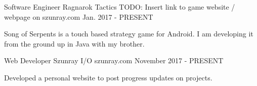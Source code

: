 


\begin{cventries}


\cventry
{Software Engineer} %
{Ragnarok Tactics} %
{TODO: Insert link to game website / webpage on szunray.com} %
{Jan. 2017 - PRESENT} %
{ %
\begin{cvitems}
\item {Song of Serpents is a touch based strategy game for Android. I am developing it from the ground up in Java with my brother. }
\end{cvitems}
}

\cventry
{Web Developer} %
{Szunray I/O} %
{szunray.com} %
{November 2017 - PRESENT} %
{ %
\begin{cvitems}
\item {Developed a personal website to post progress updates on projects.} 
\end{cvitems}
}


\end{cventries}
